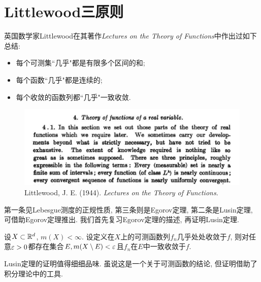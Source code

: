 \section{Littlewood三原则}
英国数学家Littlewood在其著作\textit{Lectures on the Theory of Functions}中作出过如下总结:
\begin{itemize}
    \item 每个可测集``几乎"都是有限多个区间的和;
    \item 每个函数``几乎"都是连续的;
    \item 每个收敛的函数列都``几乎"一致收敛.
\end{itemize}
\begin{figure}[h]
    \centering
    \includegraphics[scale=0.5]{image/Littlewood_3_principles.png}
    \caption{Littlewood, J. E. (1944). \textit{Lectures on the Theory of Functions}.}
    \label{fig:my_label}
\end{figure}
第一条见Lebesgue测度的正规性质, 第三条则是Egorov定理, 第二条是Lusin定理, 可借助Egorov定理推出. 我们首先复习Egorov定理的描述, 再证明Lusin定理. 
\begin{theorem}[Egorov定理]
    设$X \subset \mathbb{R}^d$, $m(X)<\infty$. 设定义在$X$上的可测函数列$f_n$几乎处处收敛于$f$, 则对任意$\varepsilon>0$都存在集合$E, m(X\setminus E)< \varepsilon$且$f_n$在$E$中一致收敛于$f$. 
\end{theorem}

Lusin定理的证明值得细细品味. 虽说这是一个关于可测函数的结论, 但证明借助了积分理论中的工具. 
